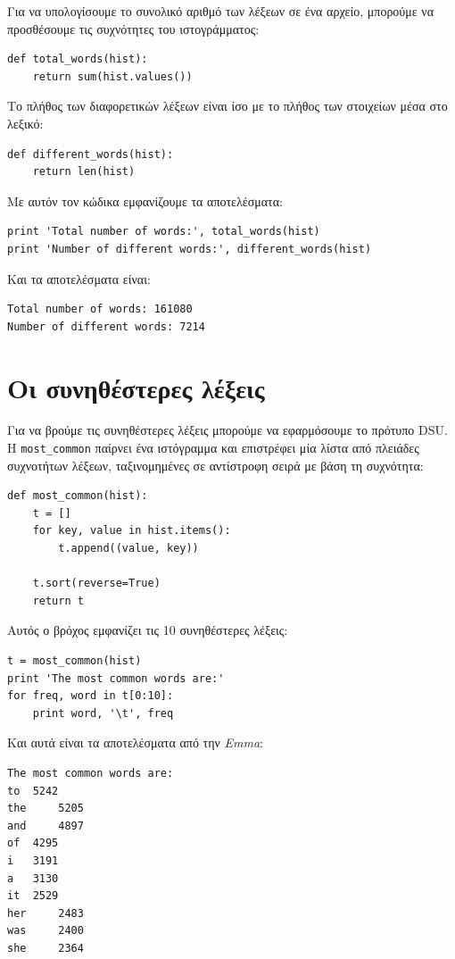 \documentclass[10pt]{book}
\begin{document}
Για να υπολογίσουμε το συνολικό αριθμό των λέξεων σε ένα αρχείο, μπορούμε να προσθέσουμε τις συχνότητες του ιστογράμματος:

\begin{verbatim}
def total_words(hist):
    return sum(hist.values())
\end{verbatim}
%
Το πλήθος των διαφορετικών λέξεων είναι ίσο με το πλήθος των στοιχείων μέσα στο λεξικό:

\begin{verbatim}
def different_words(hist):
    return len(hist)
\end{verbatim}
%
Με αυτόν τον κώδικα εμφανίζουμε τα αποτελέσματα:

\begin{verbatim}
print 'Total number of words:', total_words(hist)
print 'Number of different words:', different_words(hist)
\end{verbatim}
%
Και τα αποτελέσματα είναι:

\begin{verbatim}
Total number of words: 161080
Number of different words: 7214
\end{verbatim}
%

 
\section{Οι συνηθέστερες λέξεις}

Για να βρούμε τις συνηθέστερες λέξεις μπορούμε να εφαρμόσουμε το πρότυπο DSU. Η \verb"most_common" παίρνει ένα ιστόγραμμα και επιστρέφει μία λίστα από πλειάδες συχνοτήτων λέξεων, ταξινομημένες σε αντίστροφη σειρά με βάση τη συχνότητα:

\begin{verbatim}
def most_common(hist):
    t = []
    for key, value in hist.items():
        t.append((value, key))

    t.sort(reverse=True)
    return t
\end{verbatim}
%
Αυτός ο βρόχος εμφανίζει τις 10 συνηθέστερες λέξεις:

\begin{verbatim}
t = most_common(hist)
print 'The most common words are:'
for freq, word in t[0:10]:
    print word, '\t', freq
\end{verbatim}
%
Και αυτά είναι τα αποτελέσματα από την {\em Emma}:

\begin{verbatim}
The most common words are:
to 	5242
the 	5205
and 	4897
of 	4295
i 	3191
a 	3130
it 	2529
her 	2483
was 	2400
she 	2364
\end{verbatim}
%
\end{document}

